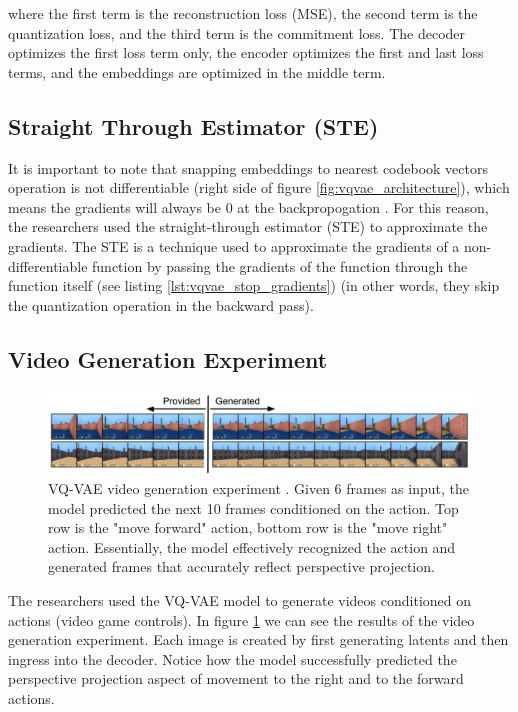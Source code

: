     where the first term is the reconstruction loss (MSE), the second term is the quantization loss, and the third term is the commitment loss. The decoder optimizes the first loss term only, the encoder optimizes the first and last loss terms, and the embeddings are optimized in the middle term.






\subsection{Straight Through Estimator (STE)}
\label{subsec:vqvae_ste}

It is important to note that snapping embeddings to nearest codebook vectors operation is not differentiable (right side of figure \ref{fig:vqvae_architecture}), which means the gradients will always be 0 at the backpropogation \cite{why_round_function_is_not_differentiable}. For this reason, the researchers used the straight-through estimator (STE) to approximate the gradients. The STE is a technique used to approximate the gradients of a non-differentiable function by passing the gradients of the function through the function itself (see listing \ref{lst:vqvae_stop_gradients}) (in other words, they skip the quantization operation in the backward pass).

\subsection{Video Generation Experiment}

\begin{figure}[h]
    \centering
    \includegraphics[width=\textwidth]{images/vqvae_video_generation.png}
    \caption{VQ-VAE video generation experiment \cite{vqvae}. Given 6 frames as input, the model predicted the next 10 frames conditioned on the action. Top row is the "move forward" action, bottom row is the "move right" action. Essentially, the model effectively recognized the action and generated frames that accurately reflect perspective projection.}
    \label{fig:vqvae_video_generation}
\end{figure}

The researchers used the VQ-VAE model to generate videos conditioned on actions (video game controls). In figure \ref{fig:vqvae_video_generation} we can see the results of the video generation experiment. Each image is created by first generating latents and then ingress into the decoder. Notice how the model successfully predicted the perspective projection aspect of movement to the right and to the forward actions.

